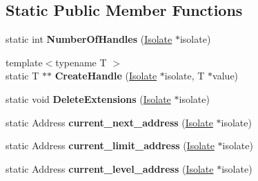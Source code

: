 \subsection*{Static Public Member Functions}
\begin{DoxyCompactItemize}
\item 
\hypertarget{classv8_1_1internal_1_1_handle_scope_a24b3e5fe5858089d5f677b6e81fb17b4}{}static int {\bfseries Number\+Of\+Handles} (\hyperlink{classv8_1_1internal_1_1_isolate}{Isolate} $\ast$isolate)\label{classv8_1_1internal_1_1_handle_scope_a24b3e5fe5858089d5f677b6e81fb17b4}

\item 
\hypertarget{classv8_1_1internal_1_1_handle_scope_acc17699237920ca346db147980b0b2c4}{}{\footnotesize template$<$typename T $>$ }\\static T $\ast$$\ast$ {\bfseries Create\+Handle} (\hyperlink{classv8_1_1internal_1_1_isolate}{Isolate} $\ast$isolate, T $\ast$value)\label{classv8_1_1internal_1_1_handle_scope_acc17699237920ca346db147980b0b2c4}

\item 
\hypertarget{classv8_1_1internal_1_1_handle_scope_a49d50c5b71e4d3aed324e3ce63bb681d}{}static void {\bfseries Delete\+Extensions} (\hyperlink{classv8_1_1internal_1_1_isolate}{Isolate} $\ast$isolate)\label{classv8_1_1internal_1_1_handle_scope_a49d50c5b71e4d3aed324e3ce63bb681d}

\item 
\hypertarget{classv8_1_1internal_1_1_handle_scope_a4ab0caf3631e3b3f5aa40d20696ca6cc}{}static Address {\bfseries current\+\_\+next\+\_\+address} (\hyperlink{classv8_1_1internal_1_1_isolate}{Isolate} $\ast$isolate)\label{classv8_1_1internal_1_1_handle_scope_a4ab0caf3631e3b3f5aa40d20696ca6cc}

\item 
\hypertarget{classv8_1_1internal_1_1_handle_scope_a49204b2b24d948e6a4b2cec31f043a0c}{}static Address {\bfseries current\+\_\+limit\+\_\+address} (\hyperlink{classv8_1_1internal_1_1_isolate}{Isolate} $\ast$isolate)\label{classv8_1_1internal_1_1_handle_scope_a49204b2b24d948e6a4b2cec31f043a0c}

\item 
\hypertarget{classv8_1_1internal_1_1_handle_scope_ad8e3d2e7853cee42d7d255e45afb1f5e}{}static Address {\bfseries current\+\_\+level\+\_\+address} (\hyperlink{classv8_1_1internal_1_1_isolate}{Isolate} $\ast$isolate)\label{classv8_1_1internal_1_1_handle_scope_ad8e3d2e7853cee42d7d255e45afb1f5e}

\end{DoxyCompactItemize}

